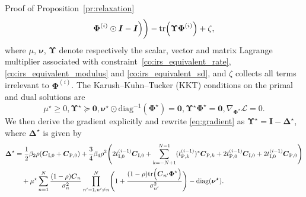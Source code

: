 \documentclass[journal,12pt,onecolumn,draftclsnofoot]{IEEEtran}
\begin{document}
\begin{appendix}
\begin{subsection}{Proof of Proposition~\ref{pr:relaxation}}
\begin{align}
						\boldsymbol{\Phi}^{(i)} \odot \boldsymbol{I} - \boldsymbol{I}
					\Bigr)
				\biggr) - \mathrm{tr} \Bigl(
					\boldsymbol{\Upsilon} \boldsymbol{\Phi}^{(i)}
				\Bigr) + \zeta,
			\end{align}
			where $\mu$, $\boldsymbol{\nu}$, $\boldsymbol{\Upsilon}$ denote respectively the scalar, vector and matrix Lagrange multiplier associated with constraint~\eqref{co:irs_equivalent_rate}, \eqref{co:irs_equivalent_modulus} and \eqref{co:irs_equivalent_sd}, and $\zeta$ collects all terms irrelevant to $\boldsymbol{\Phi}^{(i)}$. The Karush–Kuhn–Tucker (KKT) conditions on the primal and dual solutions are
			\begin{subequations}
				\begin{equation}\label{eq:lagrange_multiplier}
					\mu^\star \ge 0, \boldsymbol{\Upsilon}^\star \succeq \boldsymbol{0},
				\end{equation}
				\begin{equation}\label{eq:complementary_slackness}
					\boldsymbol{\nu}^\star \odot \mathrm{diag}^{-1}(\boldsymbol{\Phi}^\star) = \boldsymbol{0}, \boldsymbol{\Upsilon}^\star \boldsymbol{\Phi}^\star = \boldsymbol{0},
				\end{equation}
				\begin{equation}\label{eq:gradient}
					\nabla_{\boldsymbol{\Phi}^\star} \mathcal{L} = 0.
				\end{equation}
			\end{subequations}
			We then derive the gradient explicitly and rewrite \eqref{eq:gradient} as $\boldsymbol{\Upsilon}^\star = \boldsymbol{I} - \boldsymbol{\Delta}^\star$, where $\boldsymbol{\Delta}^\star$ is given by
			\begin{align}\label{eq:delta}
				\boldsymbol{\Delta}^\star
				& = \frac{1}{2} \beta_2 \rho (\boldsymbol{C}_{\mathrm{I},0}+\boldsymbol{C}_{\mathrm{P},0}) + \frac{3}{4} \beta_4 \rho^2
					\Biggl(
						2 t_{\mathrm{I},0}^{(i-1)} \boldsymbol{C}_{\mathrm{I},0} + \sum_{k=-N+1}^{N-1} (t_{\mathrm{P},k}^{(i-1)})^* \boldsymbol{C}_{\mathrm{P},k} + 2 t_{\mathrm{P},0}^{(i-1)} \boldsymbol{C}_{\mathrm{I},0} + 2 t_{\mathrm{I},0}^{(i-1)} \boldsymbol{C}_{\mathrm{P},0}
					\Biggr)\nonumber\\
				& \quad + \mu^\star \sum_{n=1}^N \frac{(1-\rho) \boldsymbol{C}_n}{\sigma_n^2} \prod_{n'=1,n' \ne n}^N \Biggl(
					1 + \frac{(1-\rho)\mathrm{tr}\Bigl(
						\boldsymbol{C}_{n'} \boldsymbol{\Phi}^\star
					\Bigr)}{\sigma_{n'}^2}
				\Biggr) - \mathrm{diag}(\boldsymbol{\nu^\star}).
			\end{align}

\end{subsection}
\end{appendix}
\end{document}
